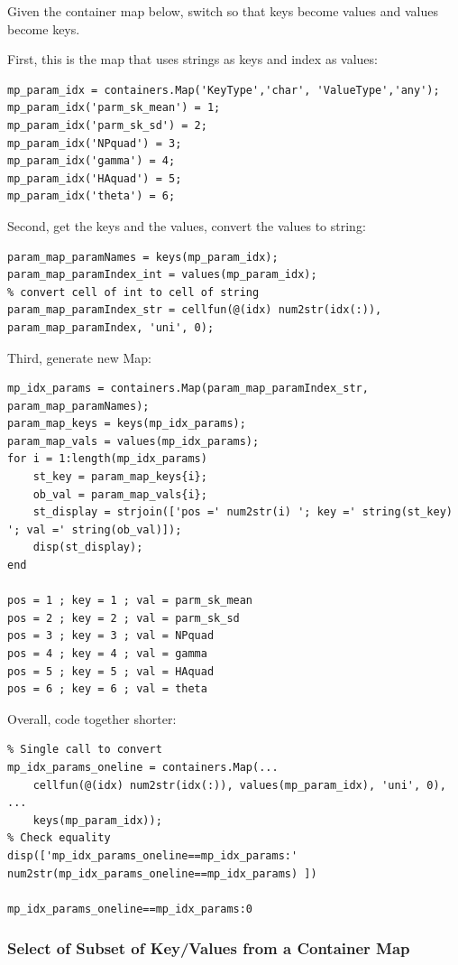 \documentclass[
]{book}
\begin{document}
Given the container map below, switch so that keys become values and
values become keys.

First, this is the map that uses strings as keys and index as values:

\begin{verbatim}
mp_param_idx = containers.Map('KeyType','char', 'ValueType','any');
mp_param_idx('parm_sk_mean') = 1;
mp_param_idx('parm_sk_sd') = 2;
mp_param_idx('NPquad') = 3;
mp_param_idx('gamma') = 4;
mp_param_idx('HAquad') = 5;
mp_param_idx('theta') = 6;
\end{verbatim}

Second, get the keys and the values, convert the values to string:

\begin{verbatim}
param_map_paramNames = keys(mp_param_idx);
param_map_paramIndex_int = values(mp_param_idx);
% convert cell of int to cell of string
param_map_paramIndex_str = cellfun(@(idx) num2str(idx(:)), param_map_paramIndex, 'uni', 0);
\end{verbatim}

Third, generate new Map:

\begin{verbatim}
mp_idx_params = containers.Map(param_map_paramIndex_str, param_map_paramNames);
param_map_keys = keys(mp_idx_params);
param_map_vals = values(mp_idx_params);
for i = 1:length(mp_idx_params)
    st_key = param_map_keys{i};
    ob_val = param_map_vals{i};
    st_display = strjoin(['pos =' num2str(i) '; key =' string(st_key) '; val =' string(ob_val)]);
    disp(st_display);
end

pos = 1 ; key = 1 ; val = parm_sk_mean
pos = 2 ; key = 2 ; val = parm_sk_sd
pos = 3 ; key = 3 ; val = NPquad
pos = 4 ; key = 4 ; val = gamma
pos = 5 ; key = 5 ; val = HAquad
pos = 6 ; key = 6 ; val = theta
\end{verbatim}

Overall, code together shorter:

\begin{verbatim}
% Single call to convert
mp_idx_params_oneline = containers.Map(...
    cellfun(@(idx) num2str(idx(:)), values(mp_param_idx), 'uni', 0), ...
    keys(mp_param_idx));
% Check equality
disp(['mp_idx_params_oneline==mp_idx_params:' num2str(mp_idx_params_oneline==mp_idx_params) ])

mp_idx_params_oneline==mp_idx_params:0
\end{verbatim}

\hypertarget{select-of-subset-of-keyvalues-from-a-container-map}{%
\subsubsection{Select of Subset of Key/Values from a Container Map}\label{select-of-subset-of-keyvalues-from-a-container-map}}
\end{document}
